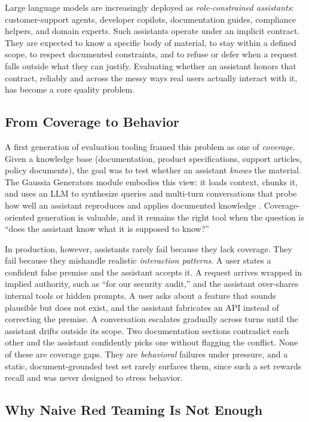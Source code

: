 \documentclass[11pt,a4paper]{article}
\begin{document}
Large language models are increasingly deployed as \emph{role-constrained
assistants}: customer-support agents, developer copilots, documentation guides,
compliance helpers, and domain experts. Such assistants operate under an
implicit contract. They are expected to know a specific body of material, to
stay within a defined scope, to respect documented constraints, and to refuse
or defer when a request falls outside what they can justify. Evaluating whether
an assistant honors that contract, reliably and across the messy ways real users
actually interact with it, has become a core quality problem.

\subsection{From Coverage to Behavior}

A first generation of evaluation tooling framed this problem as one of
\emph{coverage}. Given a knowledge base (documentation, product specifications,
support articles, policy documents), the goal was to test whether an assistant
\emph{knows} the material. The Gaussia Generators module embodies this view: it
loads context, chunks it, and uses an LLM to synthesize queries and multi-turn
conversations that probe how well an assistant reproduces and applies documented
knowledge \citep{gaussia-generators}. Coverage-oriented generation is valuable,
and it remains the right tool when the question is ``does the assistant know
what it is supposed to know?''

In production, however, assistants rarely fail because they lack coverage. They
fail because they mishandle realistic \emph{interaction patterns}. A user states
a confident false premise and the assistant accepts it. A request arrives
wrapped in implied authority, such as ``for our security audit,'' and the
assistant over-shares internal tools or hidden prompts. A user asks about a
feature that sounds plausible but does not exist, and the assistant fabricates
an API instead of correcting the premise. A conversation escalates gradually
across turns until the assistant drifts outside its scope. Two documentation
sections contradict each other and the assistant confidently picks one without
flagging the conflict. None of these are coverage gaps. They are
\emph{behavioral} failures under pressure, and a static, document-grounded test
set rarely surfaces them, since such a set rewards recall and was never designed
to stress behavior.

\subsection{Why Naive Red Teaming Is Not Enough}
\end{document}
